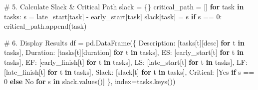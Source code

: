 \documentclass[
  letterpaper,
  DIV=11,
  numbers=noendperiod]{scrreprt}
\newenvironment{Shaded}{\begin{snugshade}}{\end{snugshade}}
\newcommand{\CommentTok}[1]{\textcolor[rgb]{0.37,0.37,0.37}{#1}}
\newcommand{\ControlFlowTok}[1]{\textcolor[rgb]{0.00,0.23,0.31}{\textbf{#1}}}
\newcommand{\DecValTok}[1]{\textcolor[rgb]{0.68,0.00,0.00}{#1}}
\newcommand{\KeywordTok}[1]{\textcolor[rgb]{0.00,0.23,0.31}{\textbf{#1}}}
\newcommand{\NormalTok}[1]{\textcolor[rgb]{0.00,0.23,0.31}{#1}}
\newcommand{\OperatorTok}[1]{\textcolor[rgb]{0.37,0.37,0.37}{#1}}
\newcommand{\StringTok}[1]{\textcolor[rgb]{0.13,0.47,0.30}{#1}}
\begin{document}
\begin{Shaded}
\begin{Highlighting}[]
\CommentTok{\# 5. Calculate Slack \& Critical Path}
\NormalTok{slack }\OperatorTok{=}\NormalTok{ \{\}}
\NormalTok{critical\_path }\OperatorTok{=}\NormalTok{ []}
\ControlFlowTok{for}\NormalTok{ task }\KeywordTok{in}\NormalTok{ tasks:}
\NormalTok{    s }\OperatorTok{=}\NormalTok{ late\_start[task] }\OperatorTok{{-}}\NormalTok{ early\_start[task]}
\NormalTok{    slack[task] }\OperatorTok{=}\NormalTok{ s}
    \ControlFlowTok{if}\NormalTok{ s }\OperatorTok{==} \DecValTok{0}\NormalTok{:}
\NormalTok{        critical\_path.append(task)}

\CommentTok{\# 6. Display Results}
\NormalTok{df }\OperatorTok{=}\NormalTok{ pd.DataFrame(\{}
    \StringTok{\textquotesingle{}Description\textquotesingle{}}\NormalTok{: [tasks[t][}\StringTok{\textquotesingle{}desc\textquotesingle{}}\NormalTok{] }\ControlFlowTok{for}\NormalTok{ t }\KeywordTok{in}\NormalTok{ tasks],}
    \StringTok{\textquotesingle{}Duration\textquotesingle{}}\NormalTok{: [tasks[t][}\StringTok{\textquotesingle{}duration\textquotesingle{}}\NormalTok{] }\ControlFlowTok{for}\NormalTok{ t }\KeywordTok{in}\NormalTok{ tasks],}
    \StringTok{\textquotesingle{}ES\textquotesingle{}}\NormalTok{: [early\_start[t] }\ControlFlowTok{for}\NormalTok{ t }\KeywordTok{in}\NormalTok{ tasks],}
    \StringTok{\textquotesingle{}EF\textquotesingle{}}\NormalTok{: [early\_finish[t] }\ControlFlowTok{for}\NormalTok{ t }\KeywordTok{in}\NormalTok{ tasks],}
    \StringTok{\textquotesingle{}LS\textquotesingle{}}\NormalTok{: [late\_start[t] }\ControlFlowTok{for}\NormalTok{ t }\KeywordTok{in}\NormalTok{ tasks],}
    \StringTok{\textquotesingle{}LF\textquotesingle{}}\NormalTok{: [late\_finish[t] }\ControlFlowTok{for}\NormalTok{ t }\KeywordTok{in}\NormalTok{ tasks],}
    \StringTok{\textquotesingle{}Slack\textquotesingle{}}\NormalTok{: [slack[t] }\ControlFlowTok{for}\NormalTok{ t }\KeywordTok{in}\NormalTok{ tasks],}
    \StringTok{\textquotesingle{}Critical\textquotesingle{}}\NormalTok{: [}\StringTok{\textquotesingle{}Yes\textquotesingle{}} \ControlFlowTok{if}\NormalTok{ s }\OperatorTok{==} \DecValTok{0} \ControlFlowTok{else} \StringTok{\textquotesingle{}No\textquotesingle{}} \ControlFlowTok{for}\NormalTok{ s }\KeywordTok{in}\NormalTok{ slack.values()]}
\NormalTok{\}, index}\OperatorTok{=}\NormalTok{tasks.keys())}


\end{Highlighting}
\end{Shaded}
\end{document}
